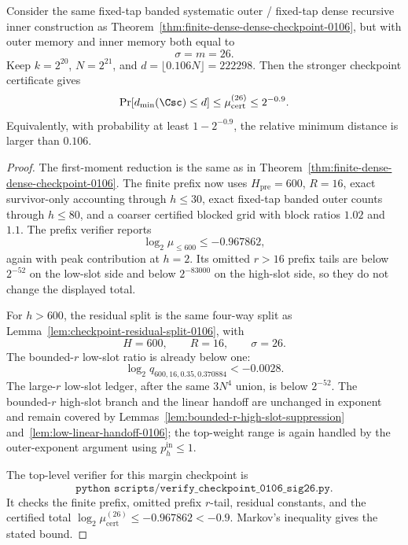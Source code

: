 \begin{theorem}
\label{thm:finite-dense-dense-checkpoint-0106-sigma26}
Consider the same fixed-tap banded systematic outer / fixed-tap dense recursive inner construction as
Theorem~\ref{thm:finite-dense-dense-checkpoint-0106}, but with outer memory and inner memory both equal to
\[
\sigma=m=26.
\]
Keep \(k=2^{20}\), \(N=2^{21}\), and \(d=\lfloor0.106N\rfloor=222298\).  Then the stronger checkpoint certificate gives
\[
\Pr[d_{\min}(\Csc)\le d]
\le
\mu_{\mathrm{cert}}^{(26)}
\le
2^{-0.9}.
\]
Equivalently, with probability at least \(1-2^{-0.9}\), the relative minimum distance is larger than \(0.106\).
\end{theorem}

\begin{proof}
The first-moment reduction is the same as in Theorem~\ref{thm:finite-dense-dense-checkpoint-0106}.  The finite prefix
now uses \(H_{\mathrm{pre}}=600\), \(R=16\), exact survivor-only accounting through \(h\le30\), exact fixed-tap banded
outer counts through \(h\le80\), and a coarser certified blocked grid with block ratios \(1.02\) and \(1.1\).  The
prefix verifier reports
\[
\log_2\mu_{\le600}\le -0.967862,
\]
again with peak contribution at \(h=2\).  Its omitted \(r>16\) prefix tails are below \(2^{-52}\) on the low-slot side
and below \(2^{-83000}\) on the high-slot side, so they do not change the displayed total.

For \(h>600\), the residual split is the same four-way split as Lemma~\ref{lem:checkpoint-residual-split-0106}, with
\[
H=600,\qquad R=16,\qquad \sigma=26.
\]
The bounded-\(r\) low-slot ratio is already below one:
\[
\log_2 q_{600,16,0.35,0.370884}<-0.0028.
\]
The large-\(r\) low-slot ledger, after the same \(3N^4\) union, is below \(2^{-52}\).  The bounded-\(r\) high-slot
branch and the linear handoff are unchanged in exponent and remain covered by
Lemmas~\ref{lem:bounded-r-high-slot-suppression} and~\ref{lem:low-linear-handoff-0106}; the top-weight range is again
handled by the outer-exponent argument using \(p_h^{\mathrm{in}}\le1\).

The top-level verifier for this margin checkpoint is
\[
\texttt{python scripts/verify\_checkpoint\_0106\_sig26.py}.
\]
It checks the finite prefix, omitted prefix \(r\)-tail, residual constants, and the certified total
\(\log_2\mu_{\mathrm{cert}}^{(26)}\le -0.967862<-0.9\).  Markov's inequality gives the stated bound.
\end{proof}

